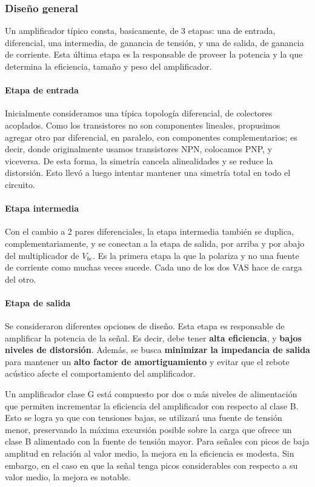 \documentclass[a4paper,12pt,twoside]{article}
\begin{document}
\subsubsection{Diseño general}

Un amplificador típico consta, basicamente, de 3 etapas: una de entrada, diferencial,  una intermedia, de ganancia de tensión, y una de salida, de ganancia de corriente. Esta última etapa es la responsable de proveer la potencia y la que determina la eficiencia, tamaño y peso del amplificador. 


\paragraph{Etapa de entrada}
Inicialmente consideramos una típica topología diferencial, de colectores acoplados. Como los transistores no son componentes lineales, propusimos agregar otro par diferencial, en paralelo, con componentes complementarios; es decir, donde originalmente usamos transistores NPN, colocamos PNP, y viceversa. De esta forma, la simetría cancela alinealidades y se reduce la distorsión. Esto llevó a luego intentar mantener una simetría total en todo el circuito.

\paragraph{Etapa intermedia}

Con el cambio a 2 pares diferenciales, la etapa intermedia también se duplica, complementariamente, y se conectan a la etapa de salida, por arriba y por abajo del multiplicador de $V_{be}$. Es la primera etapa la que la polariza y no una fuente de corriente como muchas veces sucede. Cada uno de los dos VAS hace de carga del otro.

\paragraph{Etapa de salida}
Se consideraron diferentes opciones de diseño. Esta etapa es responsable de amplificar la potencia de la señal. Es decir, debe tener \textbf{alta eficiencia}, y \textbf{bajos niveles de distorsión}. Además, se busca \textbf{minimizar la impedancia de salida} para mantener un \textbf{alto factor de amortiguamiento} y evitar que el rebote acústico afecte el comportamiento del amplificador. 


Un amplificador clase G está compuesto por dos o más niveles de alimentación que permiten incrementar la eficiencia del amplificador con respecto al clase B. Esto se logra ya que con tensiones bajas, se utilizará una fuente de tensión menor, preservando la máxima excursión posible sobre la carga que ofrece un clase B alimentado con la fuente de tensión mayor. Para señales con picos de baja amplitud en relación al valor medio, la mejora en la eficiencia es modesta. Sin embargo, en el caso en que la señal tenga picos considerables con respecto a su valor medio, la mejora es notable.
\end{document}
